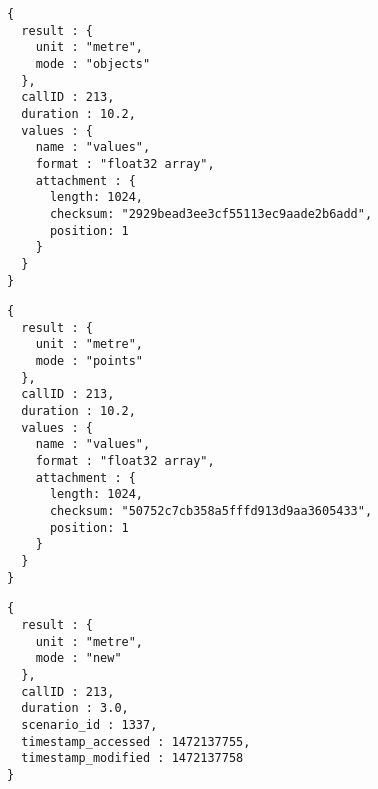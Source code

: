 \begin{lstlisting}[caption={A qua-compliant service output for mode \texttt{objects}}, label={lst:quacompliantresult:objects}]
{
  result : {
    unit : "metre",
    mode : "objects"
  },
  callID : 213,
  duration : 10.2,
  values : {
    name : "values",
    format : "float32 array",
    attachment : {
      length: 1024,
      checksum: "2929bead3ee3cf55113ec9aade2b6add",
      position: 1
    }
  }
}
\end{lstlisting}

\begin{lstlisting}[caption={A qua-compliant service output for mode \texttt{points}}, label={lst:quacompliantresult:points}]
{
  result : {
    unit : "metre",
    mode : "points"
  },
  callID : 213,
  duration : 10.2,
  values : {
    name : "values",
    format : "float32 array",
    attachment : {
      length: 1024,
      checksum: "50752c7cb358a5fffd913d9aa3605433",
      position: 1
    }
  }
}
\end{lstlisting}

\begin{lstlisting}[caption={A qua-compliant service output for mode \texttt{new}}, label={lst:quacompliantresult:new}]
{
  result : {
    unit : "metre",
    mode : "new"
  },
  callID : 213,
  duration : 3.0,
  scenario_id : 1337,
  timestamp_accessed : 1472137755,
  timestamp_modified : 1472137758
}
\end{lstlisting}

\clearpage
